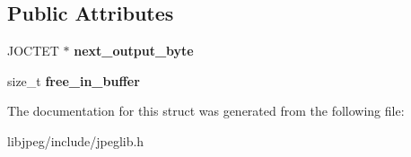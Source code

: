 \subsection*{Public Attributes}
\begin{DoxyCompactItemize}
\item 
\hypertarget{structjpeg__destination__mgr_a7fac15f83b05d50d5a35461620e9c34a}{J\-O\-C\-T\-E\-T $\ast$ {\bfseries next\-\_\-output\-\_\-byte}}\label{structjpeg__destination__mgr_a7fac15f83b05d50d5a35461620e9c34a}

\item 
\hypertarget{structjpeg__destination__mgr_a397cc63a089447fe96e35062c4979906}{size\-\_\-t {\bfseries free\-\_\-in\-\_\-buffer}}\label{structjpeg__destination__mgr_a397cc63a089447fe96e35062c4979906}

\end{DoxyCompactItemize}


The documentation for this struct was generated from the following file\-:\begin{DoxyCompactItemize}
\item 
libjpeg/include/jpeglib.\-h\end{DoxyCompactItemize}
